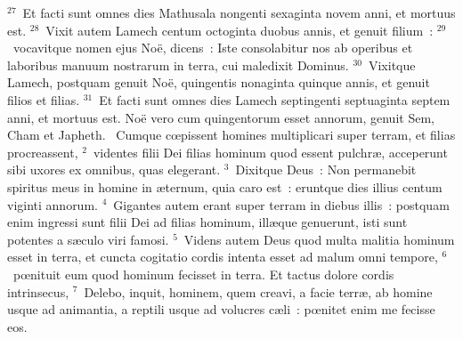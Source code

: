 ${}^{27}$~Et facti sunt omnes dies Mathusala nongenti sexaginta novem anni, et mortuus est.
${}^{28}$~Vixit autem Lamech centum octoginta duobus annis, et genuit filium~:
${}^{29}$~vocavitque nomen ejus No\"e, dicens~: Iste consolabitur nos ab operibus et laboribus manuum nostrarum in terra, cui maledixit Dominus.
${}^{30}$~Vixitque Lamech, postquam genuit No\"e, quingentis nonaginta quinque annis, et genuit filios et filias.
${}^{31}$~Et facti sunt omnes dies Lamech septingenti septuaginta septem anni, et mortuus est. No\"e vero cum quingentorum esset annorum, genuit Sem, Cham et Japheth.
~Cumque cœpissent homines multiplicari super terram, et filias procreassent,
${}^{2}$~videntes filii Dei filias hominum quod essent pulchr\ae , acceperunt sibi uxores ex omnibus, quas elegerant.
${}^{3}$~Dixitque Deus~: Non permanebit spiritus meus in homine in \ae ternum, quia caro est~: eruntque dies illius centum viginti annorum.
${}^{4}$~Gigantes autem erant super terram in diebus illis~: postquam enim ingressi sunt filii Dei ad filias hominum, ill\ae que genuerunt, isti sunt potentes a s\ae culo viri famosi.
${}^{5}$~Videns autem Deus quod multa malitia hominum esset in terra, et cuncta cogitatio cordis intenta esset ad malum omni tempore,
${}^{6}$~pœnituit eum quod hominum fecisset in terra. Et tactus dolore cordis intrinsecus,
${}^{7}$~Delebo, inquit, hominem, quem creavi, a facie terr\ae , ab homine usque ad animantia, a reptili usque ad volucres c\ae li~: pœnitet enim me fecisse eos.


